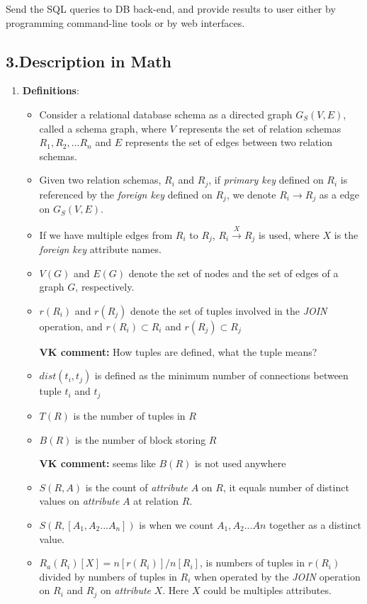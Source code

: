 Send the SQL queries to DB back-end, and provide results to user either by programming command-line tools or by web interfaces.
\begin{center}
{\section*{{\normalsize\bf 3.Description in Math}}}
\end{center}
\begin{enumerate}
\item {\bf Definitions}:
  \begin{itemize}
  \item Consider a relational database schema as a directed graph $G_S(V,E)$, called a schema graph, where $V$ represents the set of relation schemas ${R_1, R_2, ... R_n}$ and $E$ represents the set of edges between two relation schemas.
  \item Given two relation schemas, $R_i$ and $R_j$, if {\it primary key} defined on $R_i$ is referenced by the {\it foreign key} defined on $R_j$, we denote $R_i \rightarrow R_j$ as a edge on $G_S(V,E)$.
  \item If we have multiple edges from $R_i$ to $R_j$, $R_i \stackrel{X}{\longrightarrow} R_j$ is used, where $X$ is the {\it foreign key} attribute names.
  \item $V(G)$ and $E(G)$ denote the set of nodes and the set of edges of a graph $G$, respectively.
  \item $r(R_i)$ and $r(R_j)$ denote the set of tuples involved in the {\it JOIN} operation, and $r(R_i) \subset R_i$ and $r(R_j) \subset R_j$

{\bf VK comment:} How tuples are defined, what the tuple means?

  \item $dist(t_i,t_j)$ is defined as the minimum number of connections between tuple $t_i$ and $t_j$
  \item $T(R)$ is the number of tuples in $R$


  \item $B(R)$ is the number of block storing $R$

{\bf VK comment:} seems like $B(R)$ is not used anywhere

  \item $S(R, A)$ is the count of {\it attribute} $A$ on $R$, it equals number of distinct values on {\it attribute} $A$ at relation $R$.
  \item $S(R, [A_1, A_2 ... A_n])$ is when we count $A_1, A_2  ... An$ together as a distinct value.
  \item $R_a(R_i)[X] = n[r(R_i)] / n[R_i]$, is numbers of tuples in $r(R_i)$ divided by numbers of tuples in $R_i$ when operated by the {\it JOIN} operation on $R_i$ and $R_j$ on {\it attribute} $X$. Here $X$ could be multiples attributes.


\end{itemize}
\end{enumerate}
